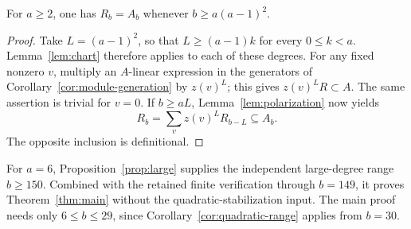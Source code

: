 \begin{proposition}\label{prop:large}
For \(a\ge2\), one has \(R_b=A_b\) whenever
\(b\ge a(a-1)^2\).
\end{proposition}
\begin{proof}
Take \(L=(a-1)^2\), so that \(L\ge(a-1)k\) for every
\(0\le k<a\). Lemma~\ref{lem:chart} therefore applies to each of
these degrees. For any fixed nonzero \(v\), multiply an \(A\)-linear
expression in the generators of Corollary~\ref{cor:module-generation}
by \(z(v)^L\); this gives \(z(v)^LR\subset A\).
The same assertion is trivial for \(v=0\). If \(b\ge aL\),
Lemma~\ref{lem:polarization} now yields
\[
                  R_b=\sum_v z(v)^L R_{b-L}\subseteq A_b.
\]
The opposite inclusion is definitional.
\end{proof}

For \(a=6\), Proposition~\ref{prop:large} supplies the independent
large-degree range \(b\ge150\). Combined with the retained finite
verification through \(b=149\), it proves Theorem~\ref{thm:main}
without the quadratic-stabilization input. The main proof needs only
\(6\le b\le29\), since Corollary~\ref{cor:quadratic-range} applies
from \(b=30\).
